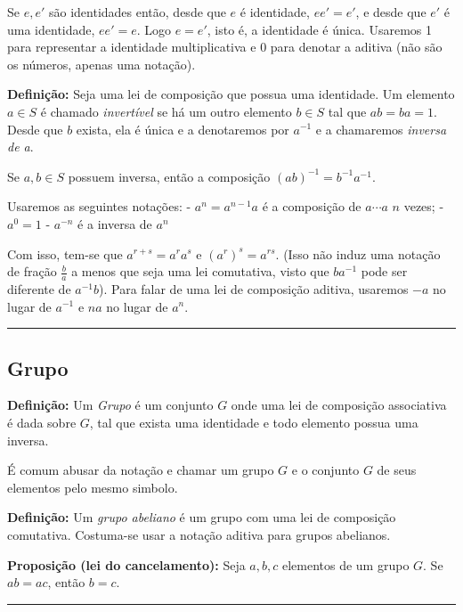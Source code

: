 \documentclass[11pt]{article}
\begin{document}
Se \(e,e'\) são identidades então, desde que \(e\) é identidade,
\(ee' = e'\), e desde que \(e'\) é uma identidade, \(ee' = e\). Logo
\(e = e'\), isto é, a identidade é única. Usaremos 1 para representar a
identidade multiplicativa e 0 para denotar a aditiva (não são os
números, apenas uma notação).

\textbf{Definição:} Seja uma lei de composição que possua uma
identidade. Um elemento \(a\in S\) é chamado \emph{invertível} se há um
outro elemento \(b\in S\) tal que \(ab = ba = 1\). Desde que \(b\)
exista, ela é única e a denotaremos por \(a^{-1}\) e a chamaremos
\emph{inversa de a}.

Se \(a,b\in S\) possuem inversa, então a composição
\((ab)^{-1} = b^{-1}a^{-1}\).

Usaremos as seguintes notações: - \(a^n = a^{n-1}a\) é a composição de
\(a\dotsb a\) \(n\) vezes; - \(a^0 = 1\) - \(a^{-n}\) é a inversa de
\(a^n\)

Com isso, tem-se que \(a^{r+s} = a^ra^s\) e \((a^r)^s = a^{rs}\). (Isso
não induz uma notação de fração \(\frac{b}{a}\) a menos que seja uma lei
comutativa, visto que \(ba^{-1}\) pode ser diferente de \(a^{-1}b\)).
Para falar de uma lei de composição aditiva, usaremos \(-a\) no lugar de
\(a^{-1}\) e \(na\) no lugar de \(a^n\).

\begin{center}\rule{0.5\linewidth}{0.5pt}\end{center}

\hypertarget{grupo}{%
\subsection{Grupo}\label{grupo}}

\textbf{Definição:} Um \emph{Grupo} é um conjunto \(G\) onde uma lei de
composição associativa é dada sobre \(G\), tal que exista uma identidade
e todo elemento possua uma inversa.

É comum abusar da notação e chamar um grupo \(G\) e o conjunto \(G\) de
seus elementos pelo mesmo simbolo.

\textbf{Definição:} Um \emph{grupo abeliano} é um grupo com uma lei de
composição comutativa. Costuma-se usar a notação aditiva para grupos
abelianos.

\textbf{Proposição (lei do cancelamento):} Seja \(a,b,c\) elementos de
um grupo \(G\). Se \(ab = ac\), então \(b = c\).

\begin{center}\rule{0.5\linewidth}{0.5pt}\end{center}
\end{document}

